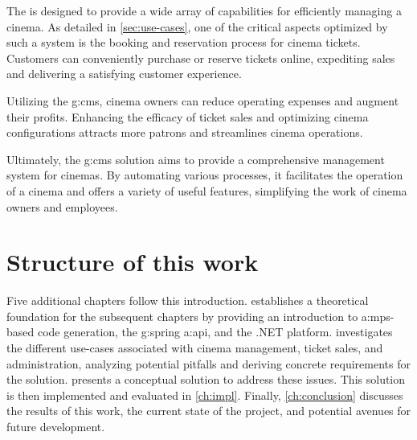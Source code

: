 The  is designed to provide a wide array of capabilities for efficiently managing a cinema. As detailed in \cref{sec:use-cases}, one of the critical aspects optimized by such a system is the booking and reservation process for cinema tickets. Customers can conveniently purchase or reserve tickets online, expediting sales and delivering a satisfying customer experience.

Utilizing the \gls{g:cms}, cinema owners can reduce operating expenses and augment their profits. Enhancing the efficacy of ticket sales and optimizing cinema configurations attracts more patrons and streamlines cinema operations.

Ultimately, the \gls{g:cms} solution aims to provide a comprehensive management system for cinemas. By automating various processes, it facilitates the operation of a cinema and offers a variety of useful features, simplifying the work of cinema owners and employees.

\section{Structure of this work}

Five additional chapters follow this introduction.  establishes a theoretical foundation for the subsequent chapters by providing an introduction to \gls{a:mps}-based code generation, the \gls{g:spring} \gls{a:api}, and the .NET platform.  investigates the different use-cases associated with cinema management, ticket sales, and administration, analyzing potential pitfalls and deriving concrete requirements for the solution.  presents a conceptual solution to address these issues. This solution is then implemented and evaluated in \cref{ch:impl}. Finally, \cref{ch:conclusion} discusses the results of this work, the current state of the project, and potential avenues for future development.